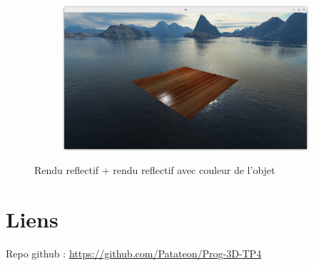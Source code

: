 \documentclass{article}
\begin{document}
\begin{figure}[h]
\begin{subfigure}[b]{0.49\textwidth}
     \end{subfigure}
     \hfill
     \begin{subfigure}[b]{0.49\textwidth}
         \centering
         \includegraphics[width=\textwidth]{images/bizarrie2.png}
     \end{subfigure}
        \caption{Rendu reflectif + rendu reflectif avec couleur de l'objet}
        \label{fig:renduReflectif}
\end{figure}

\section{Liens}

Repo github : \url{https://github.com/Patateon/Prog-3D-TP4}
\end{document}
